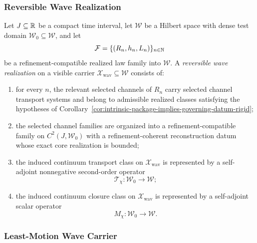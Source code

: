\subsubsection{Reversible Wave Realization}

\begin{definition}
\label{def:reversible-wave-realization}
Let \(J\subseteq \mathbb{R}\) be a compact time interval, let \(\mathcal W\) be a
Hilbert space with dense test domain \(\mathcal W_0\subseteq\mathcal W\), and
let
\[
\mathcal F=\{(R_n,h_n,L_n)\}_{n\in\mathbb{N}}
\]
be a refinement-compatible realized law family into \(\mathcal W\). A
\emph{reversible wave realization} on a visible carrier
\(\mathcal X_{\mathrm{wav}}\subseteq\mathcal W\) consists of:
\begin{enumerate}[label=(\roman*),itemsep=0.2em]
\item for every \(n\), the relevant selected channels of \(R_n\) carry
      selected channel transport systems and belong to admissible realized
      classes satisfying the hypotheses of
      Corollary~\ref{cor:intrinsic-package-implies-governing-datum-rigid};
\item the selected channel families are organized into a
      refinement-compatible family on \(C^2(J,\mathcal W_0)\) with a
      refinement-coherent reconstruction datum whose exact core realization is
      bounded;
\item the induced continuum transport class on \(\mathcal X_{\mathrm{wav}}\)
      is represented by a self-adjoint nonnegative second-order operator
      \[
      \mathcal T_{\chi}:\mathcal W_0\to\mathcal W;
      \]
\item the induced continuum closure class on \(\mathcal X_{\mathrm{wav}}\) is
      represented by a self-adjoint scalar operator
      \[
      M_{\chi}:\mathcal W_0\to\mathcal W.
      \]
\end{enumerate}
\end{definition}

\subsubsection{Least-Motion Wave Carrier}

